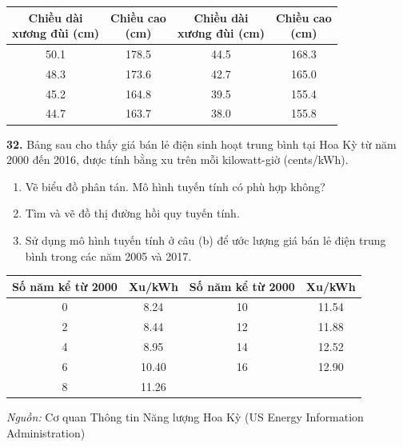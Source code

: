 \documentclass[10pt]{article}
\begin{document}
\begin{minipage}[t]{0.48\textwidth}
\vspace{0.2cm}
\begin{center}
\renewcommand{\arraystretch}{1.1}
\setlength{\tabcolsep}{4pt}
\begin{tabular}{|c|c|c|c|}
\hline
\rowcolor{stewarttableheader}
\makecell{Chiều dài\\xương đùi (cm)} & \makecell{Chiều cao\\(cm)} & \makecell{Chiều dài\\xương đùi (cm)} & \makecell{Chiều cao\\(cm)} \\
\hline
50.1 & 178.5 & 44.5 & 168.3 \\
48.3 & 173.6 & 42.7 & 165.0 \\
45.2 & 164.8 & 39.5 & 155.4 \\
44.7 & 163.7 & 38.0 & 155.8 \\
\hline
\end{tabular}
\end{center}

\vspace{0.25cm}
\noindent
\techicon\textbf{32.} Bảng sau cho thấy giá bán lẻ điện sinh hoạt trung bình tại Hoa Kỳ từ năm 2000 đến 2016, được tính bằng xu trên mỗi kilowatt-giờ (cents/kWh).
\begin{enumerate}[label=(\alph*), leftmargin=*, itemsep=2pt, topsep=2pt]
    \item Vẽ biểu đồ phân tán. Mô hình tuyến tính có phù hợp không?
    \item Tìm và vẽ đồ thị đường hồi quy tuyến tính.
    \item Sử dụng mô hình tuyến tính ở câu (b) để ước lượng giá bán lẻ điện trung bình trong các năm 2005 và 2017.
\end{enumerate}

\vspace{0.2cm}
\begin{center}
\renewcommand{\arraystretch}{1.1}
\setlength{\tabcolsep}{4pt}
\begin{tabular}{|c|c|c|c|}
\hline
\rowcolor{stewarttableheader}
Số năm kể từ 2000 & Xu/kWh & Số năm kể từ 2000 & Xu/kWh \\
\hline
0 & 8.24  & 10 & 11.54 \\
2 & 8.44  & 12 & 11.88 \\
4 & 8.95  & 14 & 12.52 \\
6 & 10.40 & 16 & 12.90 \\
8 & 11.26 &    &       \\
\hline
\end{tabular}

\vspace{1.5mm}
{\footnotesize\textit{Nguồn:} Cơ quan Thông tin Năng lượng Hoa Kỳ (US Energy Information Administration)}
\end{center}
\end{minipage}
\end{document}
